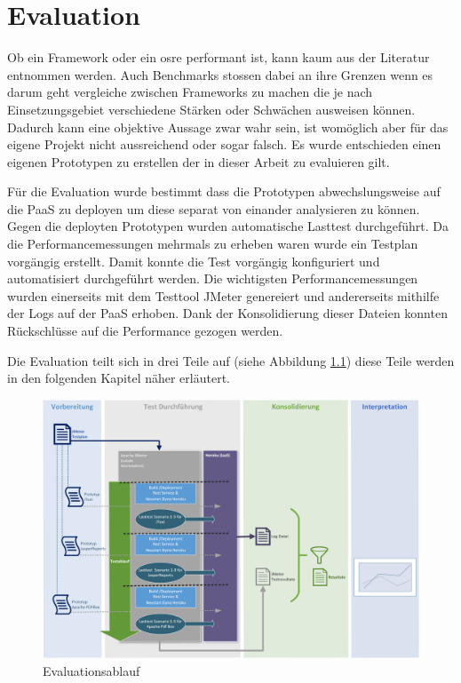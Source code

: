\documentclass[main.tex]{subfiles}
\begin{document}
\chapter{Evaluation}

Ob ein Framework oder ein \gls{osre} performant ist, kann kaum aus der Literatur entnommen werden. Auch Benchmarks stossen dabei an ihre Grenzen wenn es darum geht vergleiche zwischen Frameworks zu machen die je nach Einsetzungsgebiet verschiedene Stärken oder Schwächen ausweisen können. Dadurch kann eine objektive Aussage zwar wahr sein,  ist womöglich aber für das eigene Projekt nicht aussreichend oder sogar falsch. Es wurde entschieden einen eigenen Prototypen zu erstellen der  in dieser Arbeit  zu evaluieren gilt. 

Für die Evaluation wurde bestimmt dass  die Prototypen abwechslungsweise auf die PaaS zu deployen um diese separat von einander analysieren zu können. Gegen die deployten Prototypen wurden automatische Lasttest durchgeführt. Da die Performancemessungen mehrmals zu erheben waren  wurde ein Testplan vorgängig erstellt. Damit konnte die Test vorgängig konfiguriert und automatisiert durchgeführt werden. Die wichtigsten Performancemessungen wurden einerseits mit dem Testtool JMeter genereiert und andererseits mithilfe der Logs auf der PaaS erhoben. Dank der Konsolidierung dieser Dateien konnten Rückschlüsse auf die Performance gezogen werden.

Die Evaluation teilt sich in drei Teile auf (siehe Abbildung \ref{figure:evaluationsAblauf}) diese Teile werden in den folgenden Kapitel näher erläutert. 

\begin{figure}[h]
\includegraphics[width=\textwidth]{mainpart/3_methodik_evaluation_img/Testablauf.png}
 \caption{Evaluationsablauf}
 \label{figure:evaluationsAblauf}
\end{figure}
\end{document}
